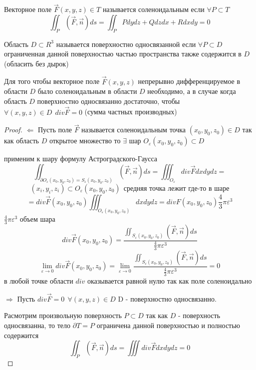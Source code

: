 \begin{define}[соленоидальности]
  Векторное поле $\vec F(x,y,z) \in T$ называется соленоидальным если
  $\forall P \subset T$
  $$
  \iint_P (\vec F, \vec n) ds = \iint_P Pdydz + Q dzdx + R dxdy = 0
  $$
\end{define}

\begin{define}
  Область $D \subset R^3$ называется поверхностно односвязанной если
  $\forall P \subset D$ ограниченная данной поверхностью частью пространства
  также содержится в $D$ (обласить без дырок)
\end{define}

\begin{block}
  Для того чтобы векторное поле $\vec F(x,y,z)$ непрерывно дифференцируемое в
  области $D$ было соленоидальным в области $D$ необходимо, а в случае когда
  область $D$ поверхностно односвязанно достаточно, чтобы
  $\forall (x,y,z) \in D ~~ div \vec F = 0$ (сумма частных производных)
\end{block}

\begin{proof}
  $\Leftarrow$ Пусть поле $\vec F$ называется соленоидальным точка
  $(x_0, y_0, z_0) \in D$ так как область $D$ открытое множество то $\exists$
  шар $O_{\varepsilon}(x_0, y_0, z_0) \subset D$

  применим к шару формулу Астроградского-Гаусса
  $$
  \iint_{\partial O_{\varepsilon}(x_0, y_0, z_0) =
  S_{\varepsilon}(x_0, y_0, z_0)} (\vec F, \vec n) ds =
  \iiint_{O_{\varepsilon}} div \vec F dxdydz =
  $$
  $$
  (x_i, y_i, z_i) \subset O_{\varepsilon}(x_0, y_0, z_0) ~~ \text{средняя точка
  лежит где-то в шаре}
  $$
  $$
  = div \vec F(x_0, y_0, z_0) \iiint_{O_{\varepsilon}(x_0, y_0, z_0)} dxdydz =
  div F(x_0, y_0, z_0) \frac{4}{3} \pi \varepsilon^3
  $$
  $\frac{4}{3} \pi \varepsilon^3$ объем шара
  $$
  div \vec F(x_0, y_0, z_0) = \frac{\iint_{S_{\varepsilon}(x_0, y_0, z_0)}
  (\vec F, \vec n) ds}{\frac{4}{3} \pi \varepsilon^3}
  $$
  $$
  \lim_{\varepsilon \to 0} div \vec F(x_0, y_0, z_0) = \lim_{\varepsilon \to 0}
  \frac{\iint_{S_{\varepsilon}(x_0, y_0, z_0)}(\vec F, \vec n) ds}
  {\frac{4}{3} \pi \varepsilon^3} = 0
  $$
  в любой точке области $div$ оказывается равной нулю так как поле соленоидально

  $\Rightarrow$ Пусть $div \vec F = 0 ~~ \forall (x,y,z) \in D$ D - поверхностно
  односвязанно.

  Расмотрим произвольную поверхность $P \subset D$ так как $D$ - поверхность
  односвязанна, то тело $\partial T = P$ ограничена данной поверхностью и
  полностью содержится
  $$
  \iint_P (\vec F, \vec n) ds = \iiint div \vec F dx dy dz = 0
  $$
\end{proof}
